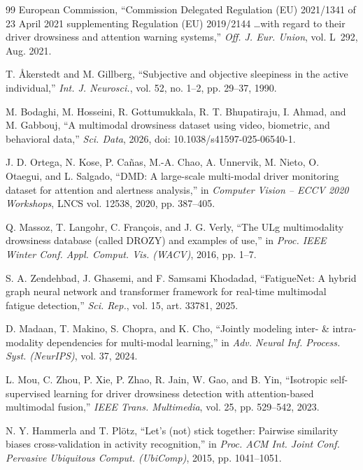 \documentclass[journal]{IEEEtran}
\begin{document}
\begin{thebibliography}{99}
European Commission, ``Commission Delegated Regulation (EU) 2021/1341 of 23
April 2021 supplementing Regulation (EU) 2019/2144 \ldots with regard to
their driver drowsiness and attention warning systems,'' \emph{Off. J. Eur.
Union}, vol. L~292, Aug. 2021.

T. {\AA}kerstedt and M. Gillberg, ``Subjective and objective sleepiness in the
active individual,'' \emph{Int. J. Neurosci.}, vol. 52, no. 1--2, pp. 29--37,
1990.

M. Bodaghi, M. Hosseini, R. Gottumukkala, R. T. Bhupatiraju, I. Ahmad, and
M. Gabbouj, ``A multimodal drowsiness dataset using video, biometric, and
behavioral data,'' \emph{Sci. Data}, 2026, doi: 10.1038/s41597-025-06540-1.

J. D. Ortega, N. Kose, P. Ca\~nas, M.-A. Chao, A. Unnervik, M. Nieto,
O. Otaegui, and L. Salgado, ``DMD: A large-scale multi-modal driver monitoring
dataset for attention and alertness analysis,'' in \emph{Computer Vision --
ECCV 2020 Workshops}, LNCS vol. 12538, 2020, pp. 387--405.

Q. Massoz, T. Langohr, C. Fran\c{c}ois, and J. G. Verly, ``The ULg
multimodality drowsiness database (called DROZY) and examples of use,'' in
\emph{Proc. IEEE Winter Conf. Appl. Comput. Vis. (WACV)}, 2016, pp. 1--7.

S. A. Zendehbad, J. Ghasemi, and F. Samsami Khodadad, ``FatigueNet: A hybrid
graph neural network and transformer framework for real-time multimodal
fatigue detection,'' \emph{Sci. Rep.}, vol. 15, art. 33781, 2025.

D. Madaan, T. Makino, S. Chopra, and K. Cho, ``Jointly modeling inter- \&
intra-modality dependencies for multi-modal learning,'' in \emph{Adv. Neural
Inf. Process. Syst. (NeurIPS)}, vol. 37, 2024.

L. Mou, C. Zhou, P. Xie, P. Zhao, R. Jain, W. Gao, and B. Yin, ``Isotropic
self-supervised learning for driver drowsiness detection with attention-based
multimodal fusion,'' \emph{IEEE Trans. Multimedia}, vol. 25, pp. 529--542,
2023.

N. Y. Hammerla and T. Pl\"otz, ``Let's (not) stick together: Pairwise
similarity biases cross-validation in activity recognition,'' in \emph{Proc.
ACM Int. Joint Conf. Pervasive Ubiquitous Comput. (UbiComp)}, 2015,
pp. 1041--1051.


\end{thebibliography}
\end{document}
